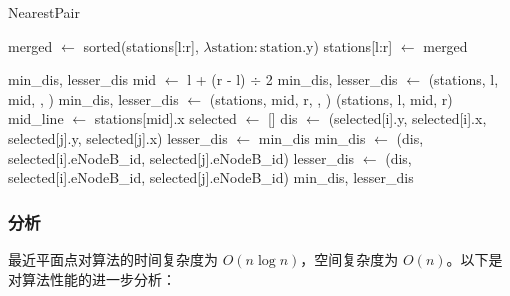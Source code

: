 \documentclass[lang=cn,11pt,a4paper]{elegantpaper}
\begin{document}
\begin{algorithm}
\caption{NearestPair}\label{alg:NearestPair}
\begin{algorithmic}
    \Comment{合并两个有序数组，区间$[l,\text{mid})$和$[\text{mid},r)$，按照$y$坐标排序}
    \State merged $\gets$ sorted(stations[l:r], $\lambda \text{station}: \text{station.y}$)
    \State stations[l:r] $\gets$ merged
\EndFunction

    \Comment{求解最近点对，区间为$[l,r)$}
        \State \Return min\_dis, lesser\_dis
    \EndIf
    \State mid $\gets$ l + (r - l) $\div$ 2
    \State min\_dis, lesser\_dis $\gets$ (stations, l, mid, , )
    \State min\_dis, lesser\_dis $\gets$ (stations, mid, r, , )
    \State {}(stations, l, mid, r)
    \State mid\_line $\gets$ stations[mid].x
    \State selected $\gets$ []
            \State {}
        \EndIf
    \EndFor
                \State {}
            \EndIf
            \State dis $\gets$ (selected[i].y, selected[i].x, selected[j].y, selected[j].x)
                \State {}
            \EndIf
                \State lesser\_dis $\gets$ min\_dis
                \State min\_dis $\gets$ (dis, selected[i].eNodeB\_id, selected[j].eNodeB\_id)
                \State lesser\_dis $\gets$ (dis, selected[i].eNodeB\_id, selected[j].eNodeB\_id)
            \EndIf
        \EndFor
    \EndFor
    \State \Return min\_dis, lesser\_dis
\EndFunction
\end{algorithmic}
\end{algorithm}

\subsubsection{分析}
最近平面点对算法的时间复杂度为 $O(n \log n)$，空间复杂度为 $O(n)$。以下是对算法性能的进一步分析：
\end{document}
